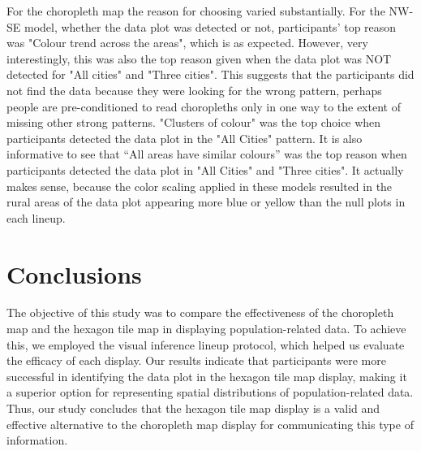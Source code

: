 \documentclass[journal]{vgtc}                     %
\begin{document}
For the choropleth map the reason for choosing varied substantially. For the NW-SE model, whether the data plot was detected or not, participants' top reason was "Colour trend across the areas", which is as expected. However, very interestingly, this was also the top reason given when the data plot was NOT detected for "All cities" and "Three cities". This suggests that the participants did not find the data because they were looking for the wrong pattern, perhaps people are pre-conditioned to read choropleths only in one way to the extent of missing other strong patterns. "Clusters of colour" was the top choice when participants detected the data plot in the "All Cities" pattern. It is also informative to see that ``All areas have similar colours'' was the top reason when participants detected the data plot in "All Cities" and "Three cities". It actually makes sense, because the color scaling applied in these models resulted in the rural areas of the data plot appearing more blue or yellow than the null plots in each lineup.




\hypertarget{discussion}{%
\section{Conclusions}\label{discussion}}

The objective of this study was to compare the effectiveness of the choropleth map and the hexagon tile map in displaying population-related data. To achieve this, we employed the visual inference lineup protocol, which helped us evaluate the efficacy of each display. Our results indicate that participants were more successful in identifying the data plot in the hexagon tile map display, making it a superior option for representing spatial distributions of population-related data. Thus, our study concludes that the hexagon tile map display is a valid and effective alternative to the choropleth map display for communicating this type of information.
\end{document}
